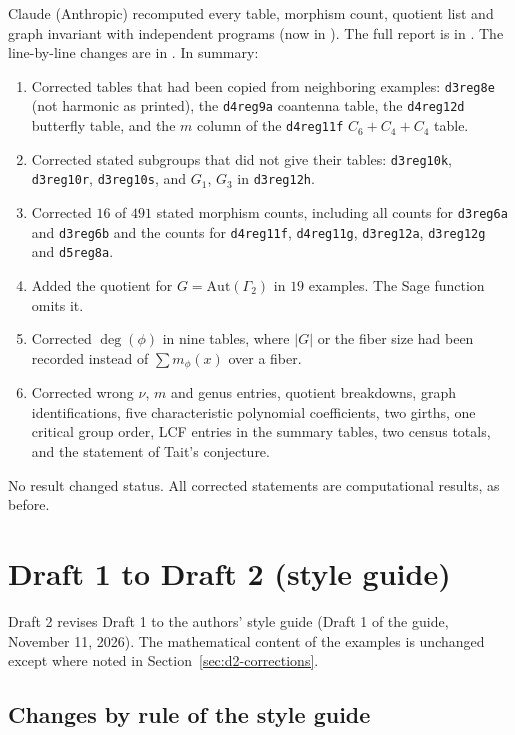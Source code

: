 \documentclass[11pt,letterpaper]{article}
\begin{document}
Claude (Anthropic) recomputed every table, morphism count, quotient list and
graph invariant with independent programs (now in ).
The full report is in . The line-by-line changes
are in . In summary:
\begin{enumerate}
\item Corrected tables that had been copied from neighboring examples:
{\tt d3reg8e} (not harmonic as printed), the {\tt d4reg9a} coantenna table,
the {\tt d4reg12d} butterfly table, and the $m$ column of the {\tt d4reg11f}
$C_6+C_4+C_4$ table.
\item Corrected stated subgroups that did not give their tables:
{\tt d3reg10k}, {\tt d3reg10r}, {\tt d3reg10s}, and $G_1$, $G_3$ in
{\tt d3reg12h}.
\item Corrected $16$ of $491$ stated morphism counts, including all counts
for {\tt d3reg6a} and {\tt d3reg6b} and the counts for {\tt d4reg11f},
{\tt d4reg11g}, {\tt d3reg12a}, {\tt d3reg12g} and {\tt d5reg8a}.
\item Added the quotient for $G=\mathrm{Aut}(\Gamma_2)$ in $19$ examples. The
Sage function  omits it.
\item Corrected $\deg(\phi)$ in nine tables, where $|G|$ or the fiber size
had been recorded instead of $\sum m_\phi(x)$ over a fiber.
\item Corrected wrong $\nu$, $m$ and genus entries, quotient breakdowns,
graph identifications, five characteristic polynomial coefficients, two
girths, one critical group order, LCF entries in the summary tables, two
census totals, and the statement of Tait's conjecture.
\end{enumerate}
No result changed status. All corrected statements are computational
results, as before.

\section{Draft 1 to Draft 2 (style guide)}

Draft 2 revises Draft 1 to the authors' style guide (Draft 1 of the guide,
November 11, 2026). The mathematical content of the examples is unchanged
except where noted in Section~\ref{sec:d2-corrections}.

\subsection{Changes by rule of the style guide}
\end{document}
